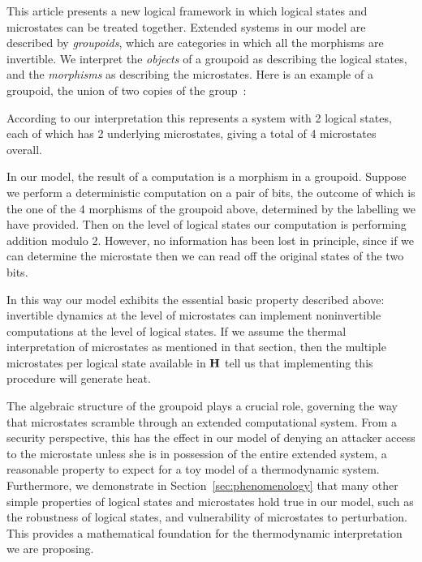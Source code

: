 \documentclass[a4paper,12pt]{article}
\theoremstyle{definition}
\newcommand\cat[1]{{\ensuremath{\bf #1}}}
\renewcommand{\-}[0]{\nobreakdash-\hspace{0pt}}
\begin{document}
This article presents a new logical framework in which logical states and microstates can be treated together. Extended systems in our model are described by \textit{groupoids}, which are categories in which all the morphisms are invertible. We interpret the \textit{objects} of a groupoid as describing the logical states, and the \textit{morphisms} as describing the microstates. Here is an example of a groupoid, the union of two copies of the group~:
\def\nodepos{\ifbool{arxiv}{5cm}{3.25}}

According to our interpretation this represents a system with 2 logical states, each of which has 2 underlying microstates, giving a total of 4 microstates overall.

In our model, the result of a computation is a morphism in a groupoid. Suppose we perform a deterministic computation on a pair of bits, the outcome of which is the one of the 4 morphisms of the groupoid above, determined by the labelling we have provided. Then  on the level of logical states our computation is performing addition modulo 2. However, no information has been lost in principle, since if we can determine the microstate then we can read off the original states of the two bits.

In this way our model exhibits the essential basic property described above: invertible dynamics at the level of microstates can implement noninvertible computations at the level of logical states. If we assume the thermal interpretation of microstates as mentioned in that section, then the multiple microstates per logical state available in \cat H tell us that implementing this procedure will generate heat.



The algebraic structure of the groupoid plays a crucial role, governing the way that microstates scramble through an extended computational system. From a security perspective, this has the effect in our model of denying an attacker access to the microstate unless she is in possession of the entire extended system, a reasonable property to expect for a toy model of a thermodynamic system. Furthermore, we demonstrate in Section~\ref{sec:phenomenology} that many other simple properties of logical states and microstates hold true in our model, such as the robustness of logical states, and vulnerability of microstates to perturbation. This provides a mathematical foundation for the thermodynamic interpretation we are proposing.
\end{document}
